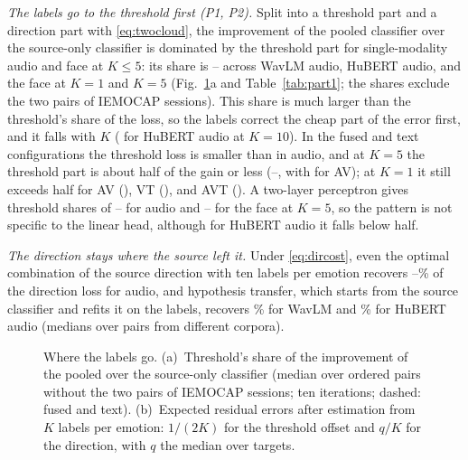 \emph{The labels go to the threshold first (P1, P2).}
Split into a threshold part and a direction part with \eqref{eq:twocloud}, the improvement of the pooled classifier over the source-only classifier is dominated by the threshold part for single-modality audio and face at $K \le 5$: its share is -- across WavLM audio, HuBERT audio, and the face at $K=1$ and $K=5$ (Fig.~\ref{fig:thresholdshare}a and Table~\ref{tab:part1}; the shares exclude the two pairs of IEMOCAP sessions).
This share is much larger than the threshold's share of the loss, so the labels correct the cheap part of the error first, and it falls with $K$ ( for HuBERT audio at $K=10$).
In the fused and text configurations the threshold loss is smaller than in audio, and at $K=5$ the threshold part is about half of the gain or less (--, with  for AV); at $K=1$ it still exceeds half for AV (), VT (), and AVT ().
A two-layer perceptron gives threshold shares of -- for audio and -- for the face at $K=5$, so the pattern is not specific to the linear head, although for HuBERT audio it falls below half.

\emph{The direction stays where the source left it.}
Under \eqref{eq:dircost}, even the optimal combination of the source direction with ten labels per emotion recovers --\% of the direction loss for audio, and hypothesis transfer, which starts from the source classifier and refits it on the labels, recovers \% for WavLM and \% for HuBERT audio (medians over pairs from different corpora).

\begin{figure}[t]
\centering
{}
\caption{Where the labels go. (a)~Threshold's share of the improvement of the pooled over the source-only classifier (median over ordered pairs without the two pairs of IEMOCAP sessions; ten iterations; dashed: fused and text). (b)~Expected residual errors after estimation from $K$ labels per emotion: $1/(2K)$ for the threshold offset and $q/K$ for the direction, with $q$ the median over targets.}
\label{fig:thresholdshare}
\end{figure}

